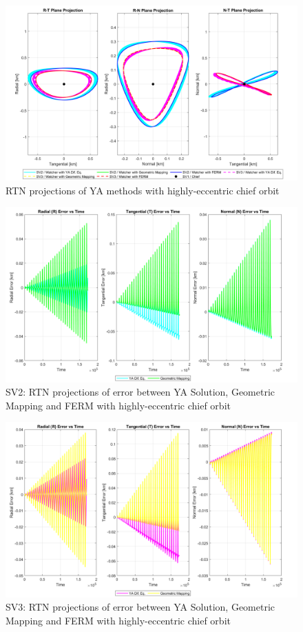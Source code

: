 \begin{figure}[H]
    \centering
    \includegraphics[width=0.7\linewidth]{sim/figures/PS3/RTN_projections_YA_comparison_3.png}
    \caption{RTN projections of YA methods with highly-eccentric chief orbit}
    \label{fig:RTN_comp_3}
\end{figure}
\begin{figure}[H]
    \centering
    \includegraphics[width=0.7\linewidth]{sim/figures/PS3/RTN_error_over_time_YA_comparison_SV2_3.png}
    \caption{SV2: RTN projections of error between YA Solution, Geometric Mapping and FERM with highly-eccentric chief orbit}
    \label{fig:RTN_error_comp_SV2_3}
\end{figure}
\begin{figure}[H]
    \centering
    \includegraphics[width=0.7\linewidth]{sim/figures/PS3/RTN_error_over_time_YA_comparison_SV3_3.png}
    \caption{SV3: RTN projections of error between YA Solution, Geometric Mapping and FERM with highly-eccentric chief orbit}
    \label{fig:RTN_error_comp_SV3_3}
\end{figure}
